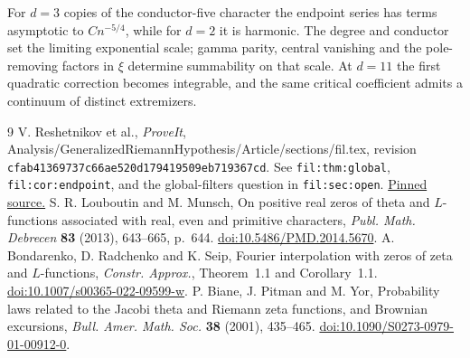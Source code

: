 \documentclass[11pt]{article}
\begin{document}
\noindent For $d=3$ copies of the conductor-five character the endpoint series has terms asymptotic to $C n^{-5/4}$, while for $d=2$ it is harmonic. The degree and conductor set the limiting exponential scale; gamma parity, central vanishing and the pole-removing factors in $\xi$ determine summability on that scale. At $d=11$ the first quadratic correction becomes integrable, and the same critical coefficient admits a continuum of distinct extremizers.

\begin{thebibliography}{9}\small
{} V. Reshetnikov et al., \emph{ProveIt}, Analysis/GeneralizedRiemannHypothesis/Article/sections/fil.tex, revision \texttt{cfab41369737c66ae520d179419509eb719367cd}. See \texttt{fil:thm:global}, \texttt{fil:cor:endpoint}, and the global-filters question in \texttt{fil:sec:open}. \href{https://github.com/VladimirReshetnikov/ProveIt/blob/cfab41369737c66ae520d179419509eb719367cd/Analysis/GeneralizedRiemannHypothesis/Article/sections/fil.tex}{Pinned source.}
 S. R. Louboutin and M. Munsch, On positive real zeros of theta and $L$-functions associated with real, even and primitive characters, \emph{Publ. Math. Debrecen} \textbf{83} (2013), 643--665, p.~644. \href{https://doi.org/10.5486/PMD.2014.5670}{doi:10.5486/PMD.2014.5670}.
 A. Bondarenko, D. Radchenko and K. Seip, Fourier interpolation with zeros of zeta and $L$-functions, \emph{Constr. Approx.}, Theorem~1.1 and Corollary~1.1. \href{https://doi.org/10.1007/s00365-022-09599-w}{doi:10.1007/s00365-022-09599-w}.
 P. Biane, J. Pitman and M. Yor, Probability laws related to the Jacobi theta and Riemann zeta functions, and Brownian excursions, \emph{Bull. Amer. Math. Soc.} \textbf{38} (2001), 435--465. \href{https://doi.org/10.1090/S0273-0979-01-00912-0}{doi:10.1090/S0273-0979-01-00912-0}.
\end{thebibliography}
\end{document}
